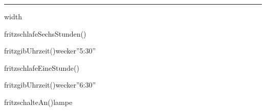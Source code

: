 \documentclass[a4paper]{scrartcl}
\begin{document}
 \hrule width \textwidth
 \vspace{1cm}
			\begin{sequencediagram}
				
				\begin{callself}[2]{fritz}{schlafeSechsStunden()}{}
				\end{callself}
				\begin{call}{fritz}{gibUhrzeit()}{wecker}{''5:30''}
				\end{call}
				\begin{callself}[2]{fritz}{schlafeEineStunde()}{}
				\end{callself}
				\begin{call}{fritz}{gibUhrzeit()}{wecker}{''6:30''}
				\end{call}
				\begin{call}{fritz}{schalteAn()}{lampe}{}
				\end{call}
			\end{sequencediagram}
\end{document}
